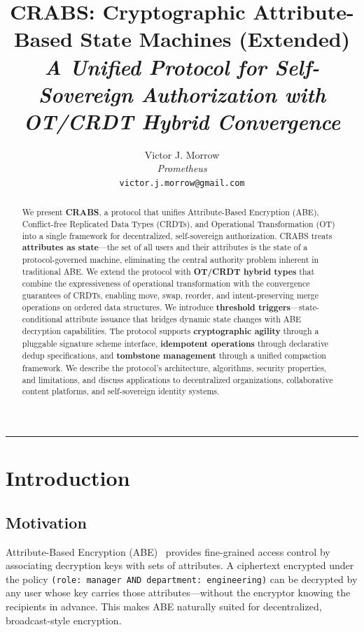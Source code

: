 \documentclass[11pt,a4paper]{article}
\title{\textbf{CRABS: Cryptographic Attribute-Based State Machines (Extended)}\\[4pt]
\large \textit{A Unified Protocol for Self-Sovereign Authorization with OT/CRDT Hybrid Convergence}}
\author{Victor J. Morrow\\[4pt]
\textit{Prometheus}\\[4pt]
\texttt{victor.j.morrow@gmail.com}}
\date{}
\begin{document}
\maketitle

\begin{center}
\rule{0.5\textwidth}{0.4pt}
\end{center}

\begin{abstract}
\noindent We present \textbf{CRABS}, a protocol that unifies Attribute-Based Encryption (ABE), Conflict-free Replicated Data Types (CRDTs), and Operational Transformation (OT) into a single framework for decentralized, self-sovereign authorization. CRABS treats \textbf{attributes as state}---the set of all users and their attributes is the state of a protocol-governed machine, eliminating the central authority problem inherent in traditional ABE. We extend the protocol with \textbf{OT/CRDT hybrid types} that combine the expressiveness of operational transformation with the convergence guarantees of CRDTs, enabling move, swap, reorder, and intent-preserving merge operations on ordered data structures. We introduce \textbf{threshold triggers}---state-conditional attribute issuance that bridges dynamic state changes with ABE decryption capabilities. The protocol supports \textbf{cryptographic agility} through a pluggable signature scheme interface, \textbf{idempotent operations} through declarative dedup specifications, and \textbf{tombstone management} through a unified compaction framework. We describe the protocol's architecture, algorithms, security properties, and limitations, and discuss applications to decentralized organizations, collaborative content platforms, and self-sovereign identity systems.
\end{abstract}

\section{Introduction}

\subsection{Motivation}

Attribute-Based Encryption (ABE)~\cite{sahai2005fuzzy} provides fine-grained access control by associating decryption keys with sets of attributes. A ciphertext encrypted under the policy \texttt{(role: manager AND department: engineering)} can be decrypted by any user whose key carries those attributes---without the encryptor knowing the recipients in advance. This makes ABE naturally suited for decentralized, broadcast-style encryption.
\end{document}

